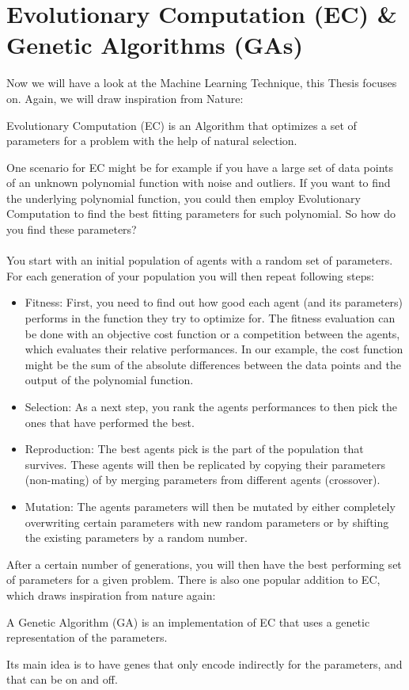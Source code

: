 \documentclass[11pt]{report}
\newcommand{\mydeflabel}{}
\newenvironment{mydef}[1]
 {\renewcommand\mydeflabel{#1}\begin{mydefinner}}
 {\end{mydefinner}}
\begin{document}
        \section{Evolutionary Computation (EC) \& Genetic Algorithms (GAs)}\label{sec:evolutionary-computation-(ec)-&-genetic-algorithms-(gas)}
    Now we will have a look at the Machine Learning Technique, this Thesis focuses on.
    Again, we will draw inspiration from Nature:
    \begin{mydef}{Evolutionary Computation}
    Evolutionary Computation (EC) is an Algorithm that optimizes a set of parameters for a problem with the help of natural selection.
    \end{mydef}
    One scenario for EC might be for example if you have a large set of data points of an unknown polynomial function with noise and outliers.
    If you want to find the underlying polynomial function, you could then employ Evolutionary Computation to find the best fitting parameters for such polynomial.
    So how do you find these parameters?
    \\ \\
    You start with an initial population of agents with a random set of parameters.
    For each generation of your population you will then repeat following steps:
    \begin{itemize}
        \item Fitness: First, you need to find out how good each agent (and its parameters) performs in the function they try to optimize for.
        The fitness evaluation can be done with an objective cost function or a competition between the agents, which evaluates their relative performances.
        In our example, the cost function might be the sum of the absolute differences between the data points and the output of the polynomial function.
        \item Selection: As a next step, you rank the agents performances to then pick the ones that have performed the best.
        \item Reproduction: The best agents pick is the part of the population that survives.
        These agents will then be replicated by copying their parameters (non-mating) of by merging parameters from different agents (crossover).
        \item Mutation: The agents parameters will then be mutated by either completely overwriting certain parameters with new random parameters or by shifting the existing parameters by a random number.
    \end{itemize}
    After a certain number of generations, you will then have the best performing set of parameters for a given problem.
    There is also one popular addition to EC, which draws inspiration from nature again:
    \begin{mydef}{Genetic Algorithm}
    A Genetic Algorithm (GA) is an implementation of EC that uses a genetic representation of the parameters.
    \end{mydef}
    Its main idea is to have genes that only encode indirectly for the parameters, and that can be on and off.
\end{document}
